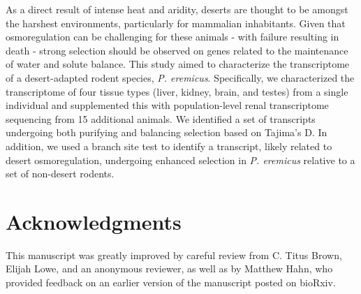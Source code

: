 \documentclass[12pt]{article}
\newcommand{\peer}{\textit{P. eremicus}}
\begin{document}
As a direct result of intense heat and aridity, deserts are thought to be amongst the harshest environments, particularly for mammalian inhabitants. Given that osmoregulation can be challenging for these animals - with failure resulting in death - strong selection should be observed on genes related to the maintenance of water and solute balance. This study aimed to characterize the transcriptome of a desert-adapted rodent species, \peer. Specifically, we characterized the transcriptome of four tissue types (liver, kidney, brain, and testes) from a single individual and supplemented this with population-level renal transcriptome sequencing from 15 additional animals. We identified a set of transcripts undergoing both purifying and balancing selection based on Tajima's D. In addition, we used a branch site test to identify a transcript, likely related to desert osmoregulation, undergoing enhanced selection in \peer\: relative to a set of non-desert rodents.  \\




\section*{Acknowledgments}

This manuscript was greatly improved by careful review from C. Titus Brown, Elijah Lowe, and an anonymous reviewer, as well as by Matthew Hahn, who provided feedback on an earlier version of the manuscript posted on bioRxiv. 



\end{document}
